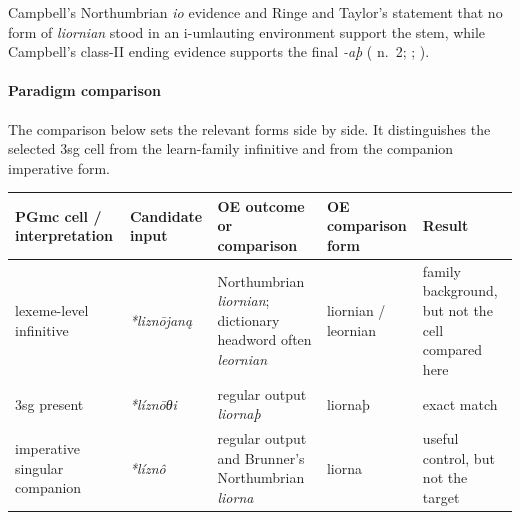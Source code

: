 \documentclass[
  british,
  a4paper,
]{article}
\newcounter{none} %
\begin{document}
Campbell's Northumbrian \emph{io} evidence and Ringe and Taylor's
statement that no form of \emph{liornian} stood in an i-umlauting
environment support the stem, while Campbell's class-II ending evidence
supports the final \emph{-aþ} ( n.~2; ; ).

\paragraph{Paradigm comparison}\label{paradigm-comparison-23}

The comparison below sets the relevant forms side by side. It
distinguishes the selected 3sg cell from the learn-family infinitive and
from the companion imperative form.

{\def\LTcaptype{none} %
\begin{longtable}[]{@{}
  >{\raggedright\arraybackslash}p{}
  >{\raggedright\arraybackslash}p{}
  >{\raggedright\arraybackslash}p{}
  >{\raggedright\arraybackslash}p{}
  >{\raggedright\arraybackslash}p{}@{}}
\toprule\noalign{}
\begin{minipage}[b]{\linewidth}\raggedright
PGmc cell / interpretation
\end{minipage} & \begin{minipage}[b]{\linewidth}\raggedright
Candidate input
\end{minipage} & \begin{minipage}[b]{\linewidth}\raggedright
OE outcome or comparison
\end{minipage} & \begin{minipage}[b]{\linewidth}\raggedright
OE comparison form
\end{minipage} & \begin{minipage}[b]{\linewidth}\raggedright
Result
\end{minipage} \\
\midrule\noalign{}
\endhead
\bottomrule\noalign{}
\endlastfoot
lexeme-level infinitive & \emph{*liznōjaną} & Northumbrian
\emph{liornian}; dictionary headword often \emph{leornian} & liornian /
leornian & family background, but not the cell compared here \\
3sg present & \emph{*líznōθi} & regular output \emph{liornaþ} & liornaþ
& exact match \\
imperative singular companion & \emph{*líznô} & regular output and
Brunner's Northumbrian \emph{liorna} & liorna & useful control, but not
the target \\
\end{longtable}
}
\end{document}
